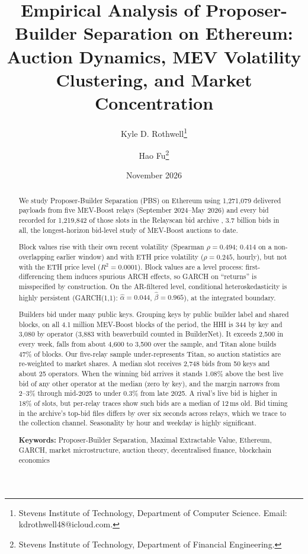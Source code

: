 \documentclass[11pt]{article}
\title{Empirical Analysis of Proposer-Builder Separation on Ethereum: \\
Auction Dynamics, MEV Volatility Clustering, and Market Concentration}
\author[1]{Kyle D. Rothwell\thanks{Stevens Institute of Technology, Department of Computer Science. Email: kdrothwell48@icloud.com.}}
\author[2]{Hao Fu\thanks{Stevens Institute of Technology, Department of Financial Engineering.}}
\affil[1,2]{Working Paper --- Stevens Institute of Technology}
\date{November 2026}
\begin{document}
\maketitle

\begin{abstract}
We study Proposer-Builder Separation (PBS) on Ethereum using 1,271,079
delivered payloads from five MEV-Boost relays (September 2024--May 2026) and
every bid recorded for 1,219,842 of those slots in the Relayscan bid archive
\citep{relayscan2024}, 3.7 billion bids in all, the longest-horizon bid-level
study of MEV-Boost auctions to date.

Block values rise with their own recent volatility (Spearman $\rho = 0.494$;
$0.414$ on a non-overlapping earlier window) and with ETH price volatility
($\rho = 0.245$, hourly), but not with the ETH price level ($R^2 = 0.0001$).
Block values are a level process: first-differencing them induces spurious
ARCH effects, so GARCH on ``returns'' is misspecified by construction. On the
AR-filtered level, conditional heteroskedasticity is highly persistent
(GARCH(1,1): $\hat\alpha = 0.044$, $\hat\beta = 0.965$), at the integrated
boundary.

Builders bid under many public keys. Grouping keys by public builder label
and shared blocks, on all 4.1 million MEV-Boost blocks of the period, the HHI
is 344 by key and 3,080 by operator (3,883 with beaverbuild counted in
BuilderNet). It exceeds 2,500 in every week, falls from about 4,600 to 3,500
over the sample, and Titan alone builds 47\% of blocks. Our five-relay sample
under-represents Titan, so auction statistics are re-weighted to market
shares. A median slot receives 2,748 bids from 50 keys and about 25
operators. When the winning bid arrives it stands 1.08\% above the best live
bid of any other operator at the median (zero by key), and the margin narrows
from 2--3\% through mid-2025 to under 0.3\% from late 2025. A rival's live bid is
higher in 18\% of slots, but per-relay traces show such bids are a median of
12\,ms old. Bid timing in the archive's top-bid files differs by over six
seconds across relays, which we trace to the collection channel. Seasonality
by hour and weekday is highly significant.

\vspace{1em}
\noindent\textbf{Keywords:} Proposer-Builder Separation, Maximal Extractable
Value, Ethereum, GARCH, market microstructure, auction theory, decentralised
finance, blockchain economics
\end{abstract}
\end{document}
